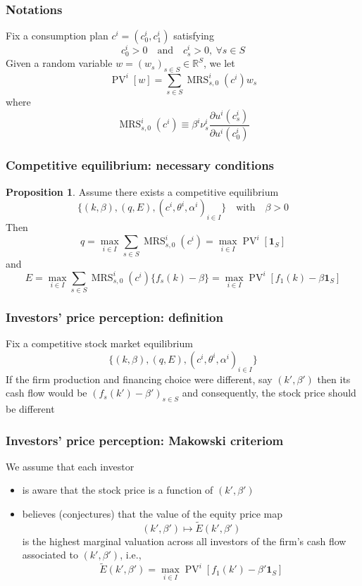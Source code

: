 \documentclass[blue]{beamer}
\DeclareMathOperator\PV{PV}
\def\R{\mathbb{R}}
\def\E{\PV}
\def\1{\mathbf{1}}
\def\et{\quad \textrm{and} \quad}
\DeclareMathOperator\MRS{MRS}
\theoremstyle{definition}
\theoremstyle{example}
\newtheorem*{proposition}{Proposition}
\begin{document}
\begin{frame}\frametitle{Notations}
Fix a consumption plan  $c^i=(c^i_0,c^i_1)$ satisfying
\[
c^i_0 >0 \et c^i_s >0, \ \forall s\in S
\]
Given a random variable $w=(w_s)_{s\in S} \in \R^S$, we let
\[
\E^i[w] = \sum_{s\in S} \MRS^i_{s,0}(c^i) w_s
\]
where
\[
\MRS^i_{s,0}(c^i) \equiv \beta^i \nu^i_s \frac{\partial u^i(c^i_s)}{\partial u^i(c^i_0)}
\]
\end{frame}
\begin{frame}\frametitle{Competitive equilibrium: necessary conditions}
\begin{proposition}
Assume there exists a competitive equilibrium
\[
\{(k,\beta),(q,E),(c^i,\theta^i,\alpha^i)_{i\in I}\} \quad \textrm{with} \quad \beta >0
\]
Then
\[
q = \max_{i\in I} \sum_{s\in S} \MRS^i_{s,0}(c^i) = \max_{i\in I} \E^i \left[ \1_S \right]
\]
and
\[
E = \max_{i\in I} \sum_{s\in S} \MRS^i_{s,0}(c^i) \{f_s(k)-\beta\} = \max_{i\in I} \E^i  \left[  f_1(k)- \beta \1_S \right]
\]
\end{proposition}
\end{frame}
\begin{frame}\frametitle{Investors' price perception: definition}
Fix a competitive stock market equilibrium
\[
\{(k,\beta),(q,E),(c^i,\theta^i,\alpha^i)_{i\in I}\}
\]
If the firm production and financing choice were different, say $(k',\beta')$ then its cash flow would be $(f_s(k') - \beta')_{s\in S}$ and consequently, the stock price should be different
\end{frame}
\begin{frame}\frametitle{Investors' price perception: Makowski criteriom}
We assume that each investor
    \begin{itemize}
    \item is aware that the stock price is a function of $(k',\beta')$
    \item believes (conjectures) that the value of the equity price map $$(k',\beta') \mapsto \widetilde{E}(k',\beta')$$ is the highest marginal valuation across all investors of the firm's cash flow
associated to $(k',\beta')$, i.e.,
        \[
        \widetilde{E}(k',\beta') = \max_{i \in I} \E^i \left[ f_1(k')-\beta' \1_S \right]
        \]
    \end{itemize}
\end{frame}
\end{document}
